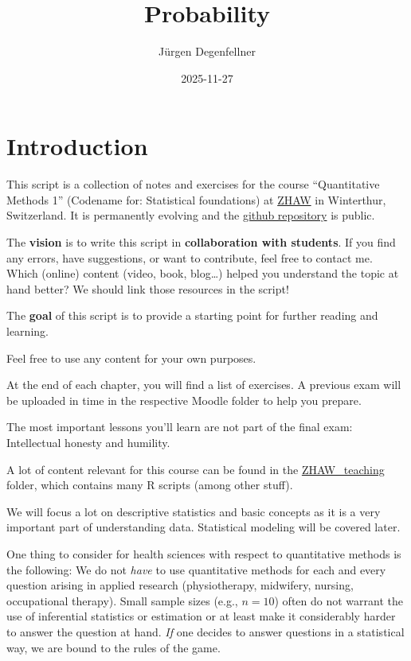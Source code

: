 \documentclass[
]{book}
\title{Probability}
\author{Jürgen Degenfellner}
\date{2025-11-27}
\begin{document}
\maketitle

{
\setcounter{tocdepth}{1}
\tableofcontents
}
\chapter{Introduction}\label{introduction}

This script is a collection of notes and exercises for the course ``Quantitative Methods 1'' (Codename for: Statistical foundations) at \href{https://www.zhaw.ch/en/university/}{ZHAW} in Winterthur, Switzerland.
It is permanently evolving and the \href{https://github.com/jdegenfellner/Script_QM1_ZHAW}{github repository} is public.

The \textbf{vision} is to write this script in \textbf{collaboration with students}. If you find any errors, have suggestions, or want to contribute, feel free to contact me.
Which (online) content (video, book, blog\ldots) helped you understand the topic at hand better? We should link those resources in the script!

The \textbf{goal} of this script is to provide a starting point for further reading and learning.

Feel free to use any content for your own purposes.

At the end of each chapter, you will find a list of exercises.
A previous exam will be uploaded in time in
the respective Moodle folder to help you prepare.

The most important lessons you'll learn are not part of the final exam: Intellectual honesty and humility.

A lot of content relevant for this course can be found in the \href{https://github.com/jdegenfellner/ZHAW_Teaching}{ZHAW\_teaching} folder,
which contains many R scripts (among other stuff).

We will focus a lot on descriptive statistics and basic concepts as it is a very important part of understanding data.
Statistical modeling will be covered later.

One thing to consider for health sciences with respect to quantitative methods is the following: We do not \emph{have} to use quantitative methods for each and every
question arising in applied research (physiotherapy, midwifery, nursing, occupational therapy). Small sample sizes (e.g., \(n=10\)) often do not warrant the use of inferential
statistics or estimation or at least make it considerably harder to answer the question at hand.
\emph{If} one decides to answer questions in a statistical way, we are bound to the rules of the game.
\end{document}
